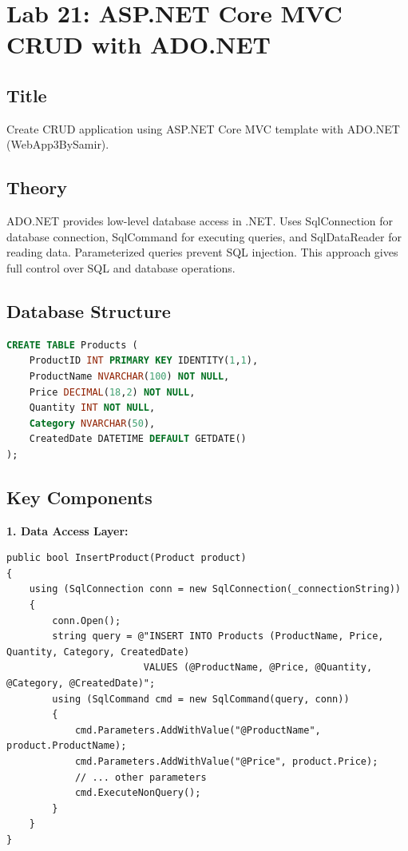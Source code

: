 \documentclass[10pt,a4paper]{article}
\begin{document}
\newpage

\section*{Lab 21: ASP.NET Core MVC CRUD with ADO.NET}

\subsection*{Title}
Create CRUD application using ASP.NET Core MVC template with ADO.NET (WebApp3BySamir).

\subsection*{Theory}
ADO.NET provides low-level database access in .NET. Uses SqlConnection for database connection, SqlCommand for executing queries, and SqlDataReader for reading data. Parameterized queries prevent SQL injection. This approach gives full control over SQL and database operations.

\subsection*{Database Structure}
\begin{lstlisting}[language=SQL, basicstyle=\ttfamily\tiny]
CREATE TABLE Products (
    ProductID INT PRIMARY KEY IDENTITY(1,1),
    ProductName NVARCHAR(100) NOT NULL,
    Price DECIMAL(18,2) NOT NULL,
    Quantity INT NOT NULL,
    Category NVARCHAR(50),
    CreatedDate DATETIME DEFAULT GETDATE()
);
\end{lstlisting}

\subsection*{Key Components}

\textbf{1. Data Access Layer:}
\begin{lstlisting}[basicstyle=\ttfamily\tiny]
public bool InsertProduct(Product product)
{
    using (SqlConnection conn = new SqlConnection(_connectionString))
    {
        conn.Open();
        string query = @"INSERT INTO Products (ProductName, Price, Quantity, Category, CreatedDate) 
                        VALUES (@ProductName, @Price, @Quantity, @Category, @CreatedDate)";
        using (SqlCommand cmd = new SqlCommand(query, conn))
        {
            cmd.Parameters.AddWithValue("@ProductName", product.ProductName);
            cmd.Parameters.AddWithValue("@Price", product.Price);
            // ... other parameters
            cmd.ExecuteNonQuery();
        }
    }
}
\end{lstlisting}
\end{document}
